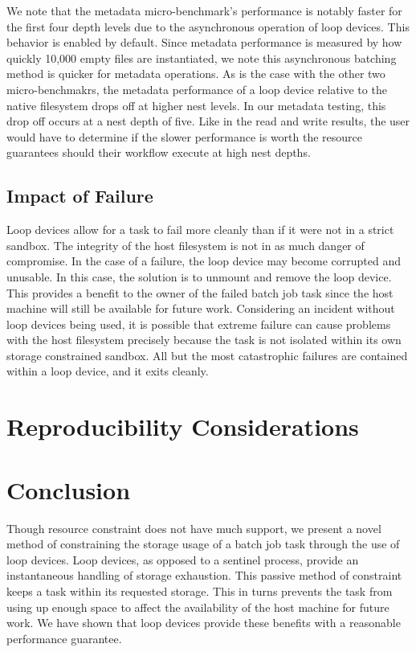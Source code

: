 \documentclass[conference]{IEEEtran}
\begin{document}
We note that the metadata micro-benchmark's performance is notably faster for the first four depth levels due to the asynchronous operation of loop devices. This behavior is enabled by default. Since metadata performance is measured by how quickly 10,000 empty files are instantiated, we note this asynchronous batching method is quicker for metadata operations. As is the case with the other two micro-benchmakrs, the metadata performance of a loop device relative to the native filesystem drops off at higher nest levels. In our metadata testing, this drop off occurs at a nest depth of five. Like in the read and write results, the user would have to determine if the slower performance is worth the resource guarantees should their workflow execute at high nest depths.

\subsection{Impact of Failure}
Loop devices allow for a task to fail more cleanly than if it were not in a strict sandbox. The integrity of the host filesystem is not in as much danger of compromise. In the case of a failure, the loop device may become corrupted and unusable. In this case, the solution is to unmount and remove the loop device. This provides a benefit to the owner of the failed batch job task since the host machine will still be available for future work. Considering an incident without loop devices being used, it is possible that extreme failure can cause problems with the host filesystem precisely because the task is not isolated within its own storage constrained sandbox. All but the most catastrophic failures are contained within a loop device, and it exits cleanly.

\section{Reproducibility Considerations}


\section{Conclusion}
Though resource constraint does not have much support, we present a novel method of constraining the storage usage of a batch job task through the use of loop devices. Loop devices, as opposed to a sentinel process, provide an instantaneous handling of storage exhaustion. This passive method of constraint keeps a task within its requested storage. This in turns prevents the task from using up enough space to affect the availability of the host machine for future work. We have shown that loop devices provide these benefits with a reasonable performance guarantee.
\end{document}
